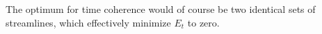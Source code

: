 The optimum for time coherence would of course be two identical sets of streamlines, which effectively minimize $E_t$ to zero.


